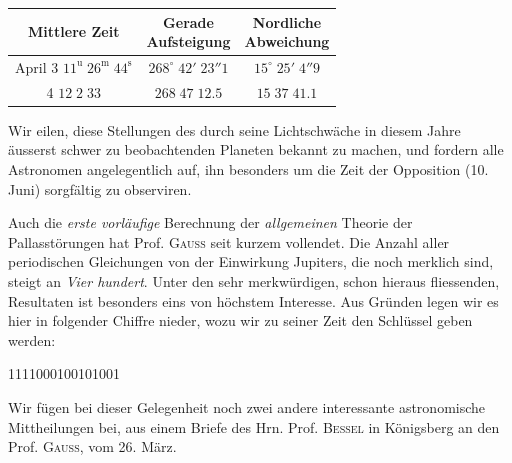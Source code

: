 \begin{center}
\fontsize{10}{12}\selectfont\setlength{\tabcolsep}{3pt}\renewcommand{\arraystretch}{1.15}\begin{tabular}{c|c|c}
Mittlere Zeit & \shortstack{Gerade\\Aufsteigung} & \shortstack{Nordliche\\Abweichung} \\
\hline
April 3 \quad $11^{\mathrm u}\;26^{\mathrm m}\;44^{\mathrm s}$ & $268^\circ\;42'\;23''1$ & $15^\circ\;25'\;4''9$ \\
\phantom{April} 4 \qquad\quad $12\;2\;33$ & $268\;47\;12.5$ & $15\;37\;41.1$ \\
\end{tabular}
\end{center}

\par\indent Wir eilen, diese Stellungen des durch seine Lichtschwäche in diesem Jahre äusserst schwer zu beobachtenden Planeten bekannt zu machen, und fordern alle Astronomen angelegentlich auf, ihn besonders um die Zeit der Opposition (10. Juni) sorgfältig zu observiren.

\par\indent Auch die \emph{erste vorläufige} Berechnung der \emph{allgemeinen} Theorie der Pallasstörungen hat Prof. \textsc{Gauss} seit kurzem vollendet. Die Anzahl aller periodischen Gleichungen von der Einwirkung Jupiters, die noch merklich sind, steigt an \emph{Vier hundert}. Unter den sehr merkwürdigen, schon hieraus fliessenden, Resultaten ist besonders eins von höchstem Interesse. Aus Gründen legen wir es hier in folgender Chiffre nieder, wozu wir zu seiner Zeit den Schlüssel geben werden:

\begin{center}
1111000100101001
\end{center}

\par\indent Wir fügen bei dieser Gelegenheit noch zwei andere interessante astronomische Mittheilungen bei, aus einem Briefe des Hrn. Prof. \textsc{Bessel} in Königsberg an den Prof. \textsc{Gauss}, vom 26. März.

